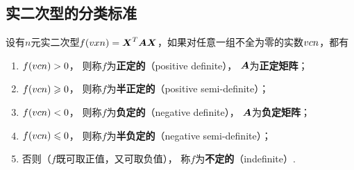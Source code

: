 \subsection{实二次型的分类标准}
\begin{definition}
设有\(n\)元实二次型\(f(v{x}{n}) = \boldsymbol{X}^T\boldsymbol{A}\boldsymbol{X}\)，如果对任意一组不全为零的实数\(v{c}{n}\)，都有
\begin{enumerate}
\item \(f(v{c}{n}) > 0\)，%
则称\(f\)为\textbf{正定的}（positive definite），%
\(\boldsymbol{A}\)为\textbf{正定矩阵}；
\item \(f(v{c}{n}) \geqslant 0\)，%
则称\(f\)为\textbf{半正定的}（positive semi-definite）；
\item \(f(v{c}{n}) < 0\)，%
则称\(f\)为\textbf{负定的}（negative definite），%
\(\boldsymbol{A}\)为\textbf{负定矩阵}；
\item \(f(v{c}{n}) \leqslant 0\)，%
则称\(f\)为\textbf{半负定的}（negative semi-definite）；
\item 否则（\(f\)既可取正值，又可取负值），%
称\(f\)为\textbf{不定的}（indefinite）.
\end{enumerate}
\end{definition}

